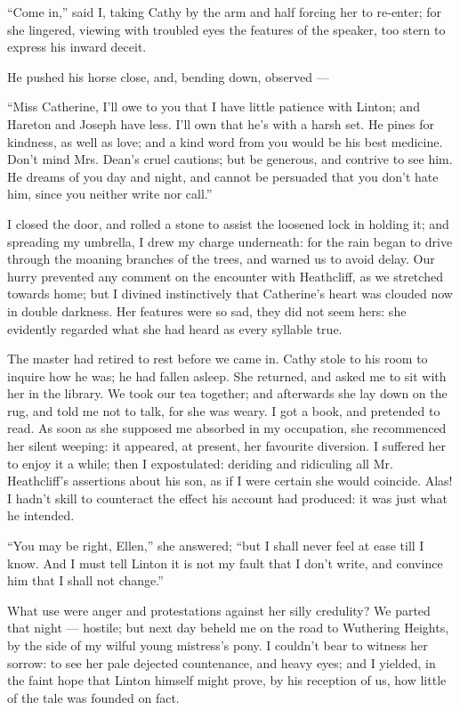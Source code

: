 \par “Come in,” said I, taking Cathy by the arm and half forcing her to re-enter; for she lingered, viewing with troubled eyes the features of the speaker, too stern to express his inward deceit.
\par He pushed his horse close, and, bending down, observed —
\par “Miss Catherine, I'll owe to you that I have little patience with Linton; and Hareton and Joseph have less. I'll own that he's with a harsh set. He pines for kindness, as well as love; and a kind word from you would be his best medicine. Don't mind Mrs. Dean's cruel cautions; but be generous, and contrive to see him. He dreams of you day and night, and cannot be persuaded that you don't hate him, since you neither write nor call.”
\par I closed the door, and rolled a stone to assist the loosened lock in holding it; and spreading my umbrella, I drew my charge underneath: for the rain began to drive through the moaning branches of the trees, and warned us to avoid delay. Our hurry prevented any comment on the encounter with Heathcliff, as we stretched towards home; but I divined instinctively that Catherine's heart was clouded now in double darkness. Her features were so sad, they did not seem hers: she evidently regarded what she had heard as every syllable true.
\par The master had retired to rest before we came in. Cathy stole to his room to inquire how he was; he had fallen asleep. She returned, and asked me to sit with her in the library. We took our tea together; and afterwards she lay down on the rug, and told me not to talk, for she was weary. I got a book, and pretended to read. As soon as she supposed me absorbed in my occupation, she recommenced her silent weeping: it appeared, at present, her favourite diversion. I suffered her to enjoy it a while; then I expostulated: deriding and ridiculing all Mr. Heathcliff's assertions about his son, as if I were certain she would coincide. Alas! I hadn't skill to counteract the effect his account had produced: it was just what he intended.
\par “You may be right, Ellen,” she answered; “but I shall never feel at ease till I know. And I must tell Linton it is not my fault that I don't write, and convince him that I shall not change.”
\par What use were anger and protestations against her silly credulity? We parted that night — hostile; but next day beheld me on the road to Wuthering Heights, by the side of my wilful young mistress's pony. I couldn't bear to witness her sorrow: to see her pale dejected countenance, and heavy eyes; and I yielded, in the faint hope that Linton himself might prove, by his reception of us, how little of the tale was founded on fact.















